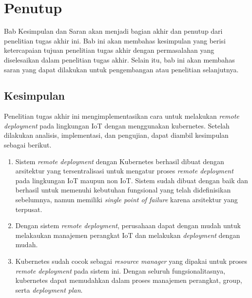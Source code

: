 \chapter{Penutup}

Bab Kesimpulan dan Saran akan menjadi bagian akhir dan penutup dari penelitian tugas akhir ini. Bab ini akan membahas kesimpulan yang berisi ketercapaian tujuan penelitian tugas akhir dengan permasalahan yang diselesaikan dalam penelitian tugas akhir. Selain itu, bab ini akan membahas saran yang dapat dilakukan untuk pengembangan atau penelitian selanjutnya.

\section{Kesimpulan}
Penelitian tugas akhir ini mengimplementasikan cara untuk melakukan \textit{remote deployment} pada lingkungan IoT dengan menggunakan kubernetes. Setelah dilakukan analisis, implementasi, dan pengujian, dapat diambil kesimpulan sebagai berikut.
\begin{enumerate}
  \item Sistem \textit{remote deployment} dengan Kubernetes berhasil dibuat dengan arsitektur yang tersentralisasi untuk mengatur proses \textit{remote deployment} pada lingkungan IoT maupun non IoT. Sistem sudah dibuat dengan baik dan berhasil untuk memenuhi kebutuhan fungsional yang telah didefinisikan sebelumnya, namun memiliki \textit{single point of failure} karena arsitektur yang terpusat.
  \item Dengan sistem \textit{remote deployment}, perusahaan dapat dengan mudah untuk melakaukan manajemen perangkat IoT dan melakukan \textit{deployment} dengan mudah.
  \item Kubernetes sudah cocok sebagai \textit{resource manager} yang dipakai untuk proses \textit{remote deployment} pada sistem ini. Dengan seluruh fungsionalitasnya, kubernetes dapat memudahkan dalam proses manajemen perangkat, group, serta \textit{deployment plan}.
\end{enumerate}

